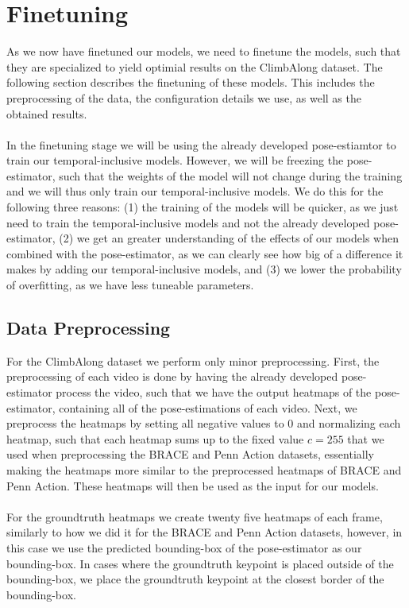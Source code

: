 \documentclass[./main.tex]{subfiles}
\begin{document}
\section{Finetuning}
\label{sec:finetuning}
As we now have finetuned our models, we need to finetune the models, such that they are specialized to yield optimial results on the ClimbAlong dataset. The following section describes the finetuning of these models. This includes the preprocessing of the data, the configuration details we use, as well as the obtained results.
\\
\\
In the finetuning stage we will be using the already developed pose-estiamtor to train our temporal-inclusive models. However, we will be freezing the pose-estimator, such that the weights of the model will not change during the training and we will thus only train our temporal-inclusive models. We do this for the following three reasons: (1) the training of the models will be quicker, as we just need to train the temporal-inclusive models and not the already developed pose-estimator, (2) we get an greater understanding of the effects of our models when combined with the pose-estimator, as we can clearly see how big of a difference it makes by adding our temporal-inclusive models, and (3) we lower the probability of overfitting, as we have less tuneable parameters.

\subsection{Data Preprocessing}
For the ClimbAlong dataset we perform only minor preprocessing. First, the preprocessing of each video is done by having the already developed pose-estimator process the video, such that we have the output heatmaps of the pose-estimator, containing all of the pose-estimations of each video. Next, we preprocess the heatmaps by setting all negative values to $0$ and normalizing each heatmap, such that each heatmap sums up to the fixed value $c = 255$ that we used when preprocessing the BRACE and Penn Action datasets, essentially making the heatmaps more similar to the preprocessed heatmaps of BRACE and Penn Action. These heatmaps will then be used as the input for our models.
\\
\\
For the groundtruth heatmaps we create twenty five heatmaps of each frame, similarly to how we did it for the BRACE and Penn Action datasets, however, in this case we use the predicted bounding-box of the pose-estimator as our bounding-box. In cases where the groundtruth keypoint is placed outside of the bounding-box, we place the groundtruth keypoint at the closest border of the bounding-box.
\end{document}
